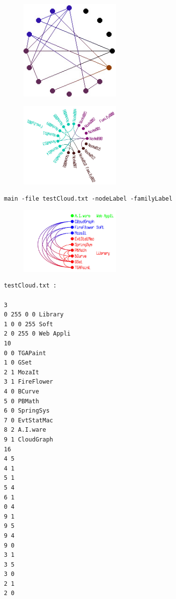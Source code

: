 \documentclass[12pt, a4paper]{article}
\begin{document}
\begin{center}
\begin{figure}[H]
\centering\includegraphics[width=5cm]{./cloud05.jpg}\\
\end{figure}
\end{center}
\begin{center}
\begin{figure}[H]
\centering\includegraphics[width=5cm]{./cloud07.jpg}\\
\end{figure}
\end{center}
\begin{scriptsize}
\begin{ttfamily}
\begin{lstlisting}
main -file testCloud.txt -nodeLabel -familyLabel
\end{lstlisting}
\end{ttfamily}
\end{scriptsize}
\begin{center}
\begin{figure}[H]
\centering\includegraphics[width=5cm]{./cloud06.jpg}\\
\end{figure}
\end{center}
\begin{scriptsize}
\begin{ttfamily}
\begin{lstlisting}
testCloud.txt :

3
0 255 0 0 Library 
1 0 0 255 Soft 
2 0 255 0 Web Appli
10
0 0 TGAPaint
1 0 GSet
2 1 MozaIt
3 1 FireFlower
4 0 BCurve
5 0 PBMath
6 0 SpringSys
7 0 EvtStatMac
8 2 A.I.ware
9 1 CloudGraph
16
4 5
4 1
5 1
5 4
6 1
0 4
9 1
9 5
9 4
9 0
3 1
3 5
3 0
2 1
2 0
\end{lstlisting}
\end{ttfamily}
\end{scriptsize}
\end{document}
